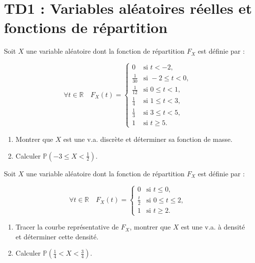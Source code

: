 \chapter*{TD1 : Variables aléatoires réelles et fonctions de répartition}

\setcounter{exercice}{0}

\begin{mdframed}
\begin{exercice}
Soit $X$ une variable aléatoire dont la fonction de répartition $F_X$ est définie par :

$$\forall t \in \mathbb{R} \quad F_X(t) = \begin{cases} 
0 & \text{si } t < -2, \\ 
\frac{1}{30} & \text{si } -2 \leqslant t < 0, \\ 
\frac{1}{12} & \text{si } 0 \leqslant t < 1, \\ 
\frac{1}{4} & \text{si } 1 \leqslant t < 3, \\ 
\frac{1}{3} & \text{si } 3 \leqslant t < 5, \\ 
1 & \text{si } t \geqslant 5. 
\end{cases}$$

\begin{enumerate}
\item Montrer que $X$ est une v.a. discrète et déterminer sa fonction de masse.
\item Calculer $\mathbb{P}\left(-3 \leqslant X < \frac{1}{2}\right)$.
\end{enumerate}
\end{exercice}
\end{mdframed}

\medskip

\begin{mdframed}
\begin{exercice}
Soit $X$ une variable aléatoire dont la fonction de répartition $F_X$ est définie par :

$$
\forall t \in \mathbb{R} \quad F_X(t) = \begin{cases} 
0 & \text{si } t \leqslant 0, \\ 
\frac{t}{2} & \text{si } 0 \leqslant t \leqslant 2, \\ 
1 & \text{si } t \geqslant 2. 
\end{cases}
$$

\begin{enumerate}
\item Tracer la courbe représentative de $F_X$, montrer que $X$ est une v.a. à densité et déterminer cette densité.
\item Calculer $\mathbb{P}\left(\frac{1}{4} < X < \frac{3}{4}\right)$.
\end{enumerate}
\end{exercice}
\end{mdframed}

